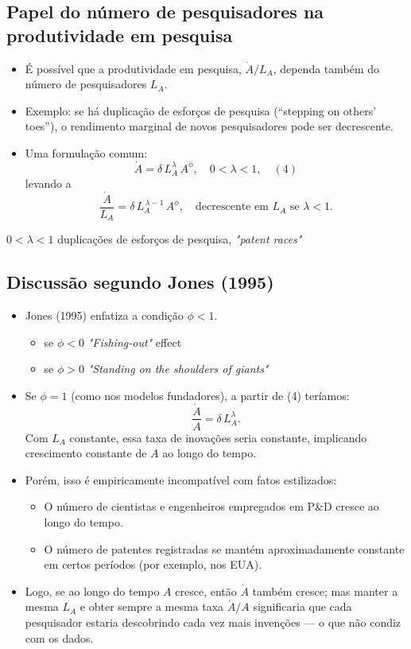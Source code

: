 \documentclass[a4paper,12pt]{article}[abntex2]
\begin{document}
\subsection{\textbf{Papel do número de pesquisadores na produtividade em pesquisa}}
\begin{itemize}
    \item É possível que a produtividade em pesquisa, 
          $\dot{A}/L_A$, dependa também do número de pesquisadores $L_A$.
    \item Exemplo: se há duplicação de esforços de pesquisa 
          (``stepping on others' toes''), 
          o rendimento marginal de novos pesquisadores pode ser decrescente.
    \item Uma formulação comum:
      \[
        \dot{A} = \delta\,L_A^\lambda\,A^\phi, 
        \quad 0 < \lambda < 1,
        \quad (4)
      \]
      levando a
      \[
        \frac{\dot{A}}{L_A}
        = 
        \delta\,L_A^{\,\lambda - 1}\,A^\phi,
        \quad
        \text{decrescente em } L_A \text{ se } \lambda < 1.
      \]
\end{itemize}

\(0 < \lambda < 1\) duplicações de esforços de pesquisa, \textit{"patent races"}


\subsection{\textbf{Discussão segundo Jones (1995)}}
\begin{itemize}
    \item Jones (1995) enfatiza a condição $\phi < 1$. \begin{itemize}
        \item se \(\phi<0\) \textit{"Fishing-out"} effect
        \item se \(\phi>0\) \textit{"Standing on the shoulders of giants"}      
    \end{itemize}
    \item Se $\phi = 1$ (como nos modelos fundadores), a partir de (4) teríamos:
      \[
        \frac{\dot{A}}{A}
        = 
        \delta\,L_A^\lambda.
      \]
      Com $L_A$ constante, essa taxa de inovações seria constante, implicando 
      crescimento constante de $A$ ao longo do tempo. 
    \item Porém, isso é empiricamente incompatível com fatos estilizados:
      \begin{itemize}
        \item O número de cientistas e engenheiros empregados em P\&D 
              cresce ao longo do tempo.
        \item O número de patentes registradas se mantém aproximadamente constante 
              em certos períodos (por exemplo, nos EUA).
      \end{itemize}
    \item Logo, se ao longo do tempo $A$ cresce, então $\dot{A}$ também cresce; 
          mas manter a mesma $L_A$ e obter sempre a mesma taxa $\dot{A}/A$ 
          significaria que cada pesquisador estaria descobrindo 
          cada vez mais invenções — o que não condiz com os dados.
\end{itemize}
\end{document}
